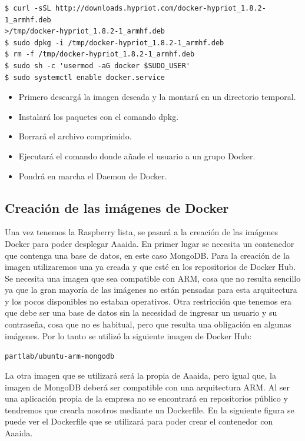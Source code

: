 \begin{verbatim}
$ curl -sSL http://downloads.hypriot.com/docker-hypriot_1.8.2-1_armhf.deb 
>/tmp/docker-hypriot_1.8.2-1_armhf.deb
$ sudo dpkg -i /tmp/docker-hypriot_1.8.2-1_armhf.deb
$ rm -f /tmp/docker-hypriot_1.8.2-1_armhf.deb
$ sudo sh -c 'usermod -aG docker $SUDO_USER'
$ sudo systemctl enable docker.service
\end{verbatim}

\begin{itemize}
\item Primero descargá la imagen deseada y la montará en un directorio temporal.
\item Instalará los paquetes con el comando dpkg.
\item Borrará el archivo comprimido.
\item Ejecutará el comando donde añade el usuario a un grupo Docker. 
\item Pondrá en marcha el Daemon de Docker.  
\end{itemize}


\subsection{Creación de las imágenes de Docker}

Una vez tenemos la Raspberry lista, se pasará a la creación de las imágenes Docker para poder desplegar Aaaida.
En primer lugar se necesita un contenedor que contenga una base de datos, en este caso MongoDB. Para la creación de la imagen utilizaremos una ya creada y que esté en los repositorios de Docker Hub. Se necesita una imagen que sea compatible con ARM, cosa que no resulta sencillo ya que la gran mayoría de las imágenes no están pensadas para esta arquitectura y los pocos disponibles no estaban operativos. Otra restricción que tenemos era que debe ser una base de datos sin la necesidad de ingresar un usuario y su contraseña, cosa que no es habitual, pero que resulta una obligación en algunas imágenes.
Por lo tanto se utilizó la siguiente imagen de Docker Hub:

\begin{center}
\texttt{partlab/ubuntu-arm-mongodb}
\end{center}

La otra imagen que se utilizará será la propia de Aaaida, pero igual que, la imagen de MongoDB deberá ser compatible con una arquitectura ARM. Al ser una aplicación propia de la empresa no se encontrará en repositorios público y tendremos que crearla nosotros mediante un Dockerfile. 
En la siguiente figura se puede ver el Dockerfile que se utilizará para poder crear el contenedor con Aaaida.

